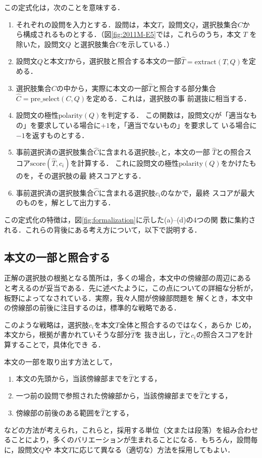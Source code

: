 \documentclass[japanese]{jnlp_1.4}
\begin{document}
この定式化は，次のことを意味する．
\begin{enumerate}
\item 
それぞれの設問を入力とする．設問は，本文$T$，設問文$Q$，選択肢集合$C$か
ら構成されるものとする．（図\ref{fig:2011M-E5}では，これらのうち，本文
$T$ を除いた，設問文$Q$ と選択肢集合$C$を示している．）
\item
設問文$Q$と本文$T$から，選択肢と照合する本文の一部$\widehat{T}=\mathrm{extract}(T, Q)$を定める．
\item 
選択肢集合$C$の中から，実際に本文の一部$\widehat{T}$と照合する部分集合
$\widehat{C} = \mathrm{pre\_select}(C, Q)$を定める．これは，選択肢の事
前選抜に相当する．
\item 
設問文の極性$\mathrm{polarity}(Q)$を判定する．
この関数は，設問文$Q$が「適当なもの」を要求している場合に$+1$を，「適当でないもの」を要求して
いる場合に$-1$を返すものとする．
\item 
事前選択済の選択肢集合$\widehat{C}$に含まれる選択肢$c_i$と，本文の一部
$\widehat{T}$との照合スコア$\mathrm{score}(\widehat{T}, c_i)$を計算する．
これに設問文の極性$\mathrm{polarity}(Q)$をかけたものを，その選択肢の最
終スコアとする．
\item 
事前選択済の選択肢集合$\widehat{C}$に含まれる選択肢$c_i$のなかで，最終
スコアが最大のものを，解として出力する．
\end{enumerate}

この定式化の特徴は，図\ref{fig:formalization}に示した(a)--(d)の4つの関
数に集約される．これらの背後にある考え方について，以下で説明する．


\subsection{本文の一部と照合する}

正解の選択肢の根拠となる箇所は，多くの場合，本文中の傍線部の周辺にある
と考えるのが妥当である．先に述べたように，この点についての詳細な分析が，
板野によってなされている\cite{Itano2010}．実際，我々人間が傍線部問題を
解くとき，本文中の傍線部の前後に注目するのは，標準的な戦略である．

このような戦略は，選択肢$c_i$を本文$T$全体と照合するのではなく，あらか
じめ，本文から，根拠が書かれていそうな部分$\widehat{T}$を
抜き出し，$\widehat{T}$と$c_i$の照合スコアを計算することで，具体化でき
る．

本文の一部を取り出す方法として，
\begin{enumerate}
\item 
本文の先頭から，当該傍線部までを$\widehat{T}$とする，
\item 
一つ前の設問で参照された傍線部から，当該傍線部までを$\widehat{T}$とする，
\item 
傍線部の前後のある範囲を$\widehat{T}$とする，
\end{enumerate}
などの方法が考えられ，これらと，採用する単位（文または段落）を組み合わせ
ることにより，多くのバリエーションが生まれることになる．もちろん，設問毎に，設問文$Q$や
本文$T$に応じて異なる（適切な）方法を採用してもよい．
\end{document}

